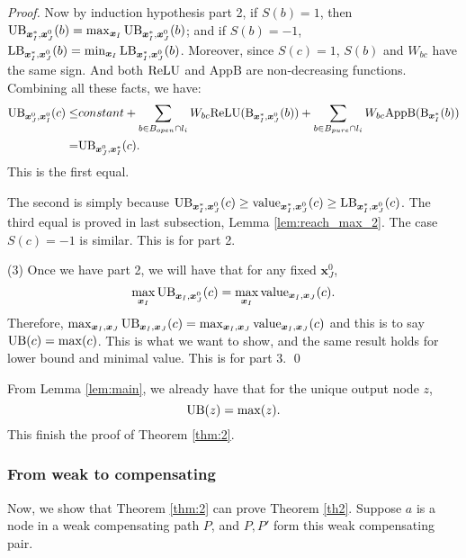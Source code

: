 \begin{proof}
				Now by induction hypothesis part 2, if $S(b)=1$, then $\mathrm{UB}_{\boldsymbol{x}^*_I,\boldsymbol{x}^0_J}(b)=\max_{\boldsymbol{x}_I}\mathrm{UB}_{\boldsymbol{x}^*_I,\boldsymbol{x}^0_J}(b)$; and if $S(b)=-1$, $\mathrm{LB}_{\boldsymbol{x}^*_I,\boldsymbol{x}^0_J}(b)=\min_{\boldsymbol{x}_I}\mathrm{LB}_{\boldsymbol{x}^*_I,\boldsymbol{x}^0_J}(b)$. Moreover, since $S(c)=1$, $S(b)$ and $W_{bc}$ have the same sign. And both $\mathrm{ReLU}$ and $\mathrm{AppB}$ are non-decreasing functions. Combining all these facts, we have:\begin{align*}
					\mathrm{UB}_{\boldsymbol{x}^0_J,\boldsymbol{x}^0_I}(c)\leq 
					&constant + \sum_{b\in B_{open}\cap l_i} W_{bc}\mathrm{ReLU}(\mathrm{B}_{\boldsymbol{x}^*_I,\boldsymbol{x}^0_J}(b)) + \sum_{b\in B_{pure}\cap l_{i}} W_{bc} \mathrm{AppB}(\mathrm{B}_{\boldsymbol{x}^*_I}(b))\\
					= & \mathrm{UB}_{\boldsymbol{x}^0_J,\boldsymbol{x}^*_I}(c). 
				\end{align*}  This is the first equal.
				
				The second is simply because $\mathrm{UB}_{\boldsymbol{x}^*_I,\boldsymbol{x}^0_J}(c)\geq {\textrm{value}}_{\boldsymbol{x}^*_I,\boldsymbol{x}^0_J}(c)\geq\mathrm{LB}_{\boldsymbol{x}^*_I,\boldsymbol{x}^0_J}(c)$.	The third equal is proved in last subsection, Lemma \ref{lem:reach_max_2}. The case $S(c)=-1$ is similar. This is for part 2.
				
				(3) Once we have part 2, we will have that for any fixed $\boldsymbol{x}^0_J$, $$\max_{\boldsymbol{x}_I} \mathrm{UB}_{\boldsymbol{x}_I,\boldsymbol{x}^0_J}(c)= \max_{\boldsymbol{x}_I} {\textrm{value}}_{\boldsymbol{x}_I,\boldsymbol{x}_J}(c).$$ Therefore, $\max_{\boldsymbol{x}_I,\boldsymbol{x}_J} \mathrm{UB}_{\boldsymbol{x}_I,\boldsymbol{x}_J}(c)= \max_{\boldsymbol{x}_I,\boldsymbol{x}_J} {\textrm{value}}_{\boldsymbol{x}_I,\boldsymbol{x}_J}(c)$ and this is to say $\mathrm{UB}(c)=\max(c)$. This is what we want to show, and the same result holds for lower bound and minimal value. This is for part 3. \qed

			\end{proof}
			
			From Lemma \ref{lem:main}, we already have that for the unique output node $z$, $$\mathrm{UB}(z)=\max(z).$$ This finish the proof of Theorem \ref{thm:2}.
			
			
			\subsubsection*{From weak to compensating}
			
			Now, we show that Theorem \ref{thm:2} can prove Theorem \ref{th2}. Suppose $a$ is a node in a weak compensating path $P$, and $P,P'$ form this weak compensating pair.
			
